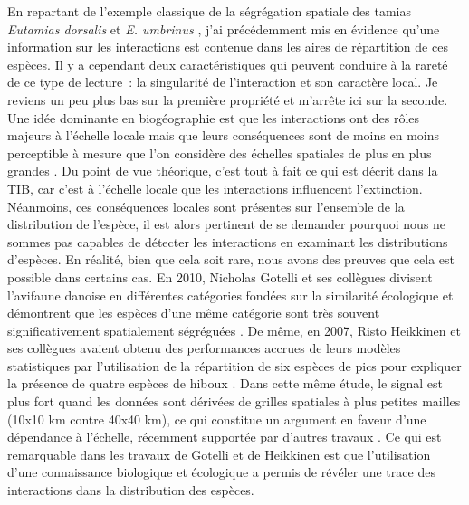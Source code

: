 En repartant de l'exemple classique de la ségrégation spatiale des
tamias \emph{Eutamias dorsalis} et \emph{E. umbrinus} \citep{Brown1971},
j'ai précédemment mis en évidence qu'une information sur les
interactions est contenue dans les aires de répartition de ces espèces.
Il y a cependant deux caractéristiques qui peuvent conduire à la rareté
de ce type de lecture~: la singularité de l'interaction et son caractère
local. Je reviens un peu plus bas sur la première propriété et m'arrête
ici sur la seconde. Une idée dominante en biogéographie est que les
interactions ont des rôles majeurs à l'échelle locale mais que leurs
conséquences sont de moins en moins perceptible à mesure que l'on
considère des échelles spatiales de plus en plus grandes \citep[voir
l'unique figure de][]{McGill2010}. Du point de vue théorique, c'est tout
à fait ce qui est décrit dans la TIB, car c'est à l'échelle locale que
les interactions influencent l'extinction. Néanmoins, ces conséquences
locales sont présentes sur l'ensemble de la distribution de l'espèce, il
est alors pertinent de se demander pourquoi nous ne sommes pas capables
de détecter les interactions en examinant les distributions d'espèces.
En réalité, bien que cela soit rare, nous avons des preuves que cela est
possible dans certains cas. En 2010, Nicholas Gotelli et ses collègues
divisent l'avifaune danoise en différentes catégories fondées sur la
similarité écologique et démontrent que les espèces d'une même catégorie
sont très souvent significativement spatialement ségréguées
\citep{Gotelli2010}. De même, en 2007, Risto Heikkinen et ses collègues
avaient obtenu des performances accrues de leurs modèles statistiques
par l'utilisation de la répartition de six espèces de pics pour
expliquer la présence de quatre espèces de hiboux \citep{Heikkinen2007}.
Dans cette même étude, le signal est plus fort quand les données sont
dérivées de grilles spatiales à plus petites mailles (10x10 km contre
40x40 km), ce qui constitue un argument en faveur d'une dépendance à
l'échelle, récemment supportée par d'autres travaux
\citep{Belmaker2015}. Ce qui est remarquable dans les travaux de Gotelli
et de Heikkinen est que l'utilisation d'une connaissance biologique et
écologique a permis de révéler une trace des interactions dans la
distribution des espèces.

